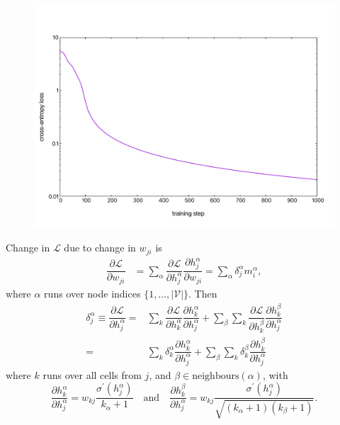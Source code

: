 \documentclass[mathserif,10pt]{beamer}
\begin{document}
\begin{frame}
  \begin{figure}
    \includegraphics[scale=0.30]{figs/fig02b.pdf}
  \end{figure}
\end{frame}

\begin{frame}
  Change in $\mathcal{L}$ due to change in $w_{ji}$ is
  \begin{equation}
    \begin{split}
      \dfrac{\partial \mathcal{L}}{\partial w_{ji}} &= \sum_\alpha \dfrac{\partial \mathcal{L}}{\partial h^\alpha_j}\dfrac{\partial h^\alpha_j}{\partial w_{ji}} = \sum_\alpha \delta^\alpha_j m^\alpha_i,
    \end{split}
  \end{equation}
  where $\alpha$ runs over node indices $\lbrace 1, \hdots, |\mathcal{V}|\rbrace$. Then
  \begin{equation}
    \begin{split}
      \delta^\alpha_j \equiv \dfrac{\partial \mathcal{L}}{\partial h^\alpha_j} =& \sum_k \dfrac{\partial \mathcal{L}}{\partial h^\alpha_k} \dfrac{\partial h^\alpha_k}{\partial h^\alpha_j} + \sum_{\beta} \sum_k \dfrac{\partial \mathcal{L}}{\partial h^\beta_k} \dfrac{\partial h^\beta_k}{\partial h^\alpha_j}\\
      =& \sum_k \delta^\alpha_k \dfrac{\partial h^\alpha_k}{\partial h^\alpha_j} + \sum_{\beta} \sum_k \delta^\beta_k \dfrac{\partial h^\beta_k}{\partial h^\alpha_j}
    \end{split}
  \end{equation}
  where $k$ runs over all cells from $j$, and $\beta \in \text{neighbours}(\alpha)$, with
  \begin{equation}
    \dfrac{\partial h^\alpha_k}{\partial h^\alpha_j} = w_{kj}\dfrac{\sigma^\prime(h_j^\alpha)}{k_\alpha + 1} \quad \text{and} \quad \dfrac{\partial h^\beta_k}{\partial h^\alpha_j} = w_{kj}\dfrac{\sigma^\prime(h_j^\alpha)}{\sqrt{(k_\alpha + 1)(k_\beta + 1)}}.
  \end{equation}
\end{frame}
\end{document}
